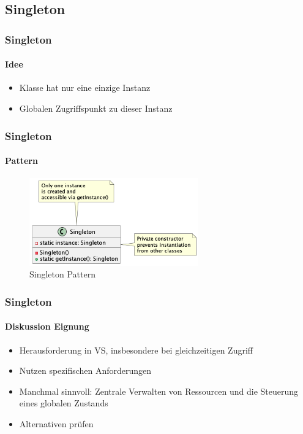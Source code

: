 \subsection{Singleton}
\begin{frame}
  \frametitle{Singleton}
  \framesubtitle{Idee}
  \begin{itemize}
    \item Klasse hat nur eine einzige Instanz
    \item Globalen Zugriffspunkt zu dieser Instanz
  
  \end{itemize}
\end{frame}

\begin{frame}
  \frametitle{Singleton}
  \framesubtitle{Pattern}
  \begin{figure}[!ht]
    \centering
    \includegraphics[width=0.65\textwidth]{fig/uml/singleton.png}
    \caption{Singleton Pattern}
    \label{fig:singleton}
  \end{figure}
\end{frame}

\begin{frame}
  \frametitle{Singleton}
  \framesubtitle{Diskussion Eignung}
  \begin{itemize}
    \item Herausforderung in VS, insbesondere bei gleichzeitigen Zugriff
    \item Nutzen spezifischen Anforderungen
    \item Manchmal sinnvoll: Zentrale Verwalten von Ressourcen und die Steuerung eines globalen Zustands
    \item Alternativen prüfen
  \end{itemize}
\end{frame}